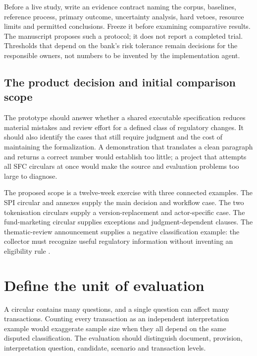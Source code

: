 \documentclass[12pt,a4paper,oneside,openany]{book}
\begin{document}
Before a live study, write an evidence contract naming the corpus, baselines,
reference process, primary outcome, uncertainty analysis, hard vetoes, resource
limits and permitted conclusions. Freeze it before examining comparative results.
The manuscript proposes such a protocol; it does not report a completed trial.
Thresholds that depend on the bank's risk tolerance remain decisions for the
responsible owners, not numbers to be invented by the implementation agent.

\subsection{The product decision and initial comparison scope}
\label{merge:P-04-prototype:00}

\label{sec:prototype}

The prototype should answer whether a shared executable specification reduces
material mistakes and review effort for a defined class of regulatory changes.
It should also identify the cases that still require judgment and the cost of
maintaining the formalization. A demonstration that translates a clean paragraph
and returns a correct number would establish too little; a project that attempts
all SFC circulars at once would make the source and evaluation problems too large
to diagnose.

The proposed scope is a twelve-week exercise with three connected examples. The
SPI circular and annexes supply the main decision and workflow case. The two
tokenisation circulars supply a version-replacement and actor-specific case.
The fund-marketing circular supplies exceptions and judgment-dependent clauses.
The thematic-review announcement supplies a negative classification example:
the collector must recognize useful regulatory information without inventing an
eligibility rule \citep{sfcspi,sfctoken2023,sfctoken2026,sfcmarketing,sfcreview2025}.

\section{Define the unit of evaluation}
\label{merge:M09:01}


A circular contains many questions, and a single question can affect many
transactions. Counting every transaction as an independent interpretation example
would exaggerate sample size when they all depend on the same disputed
classification. The evaluation should distinguish document, provision,
interpretation question, candidate, scenario and transaction levels.
\end{document}
